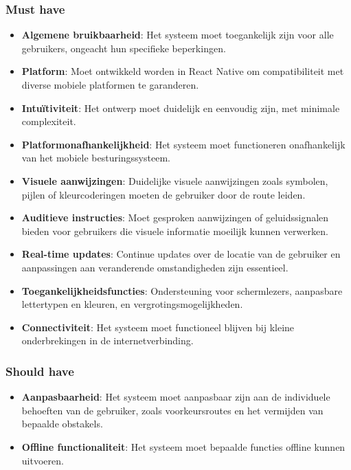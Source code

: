 \subsubsection{Must have}
\begin{itemize}
    \item \textbf{Algemene bruikbaarheid}: Het systeem moet toegankelijk zijn voor alle gebruikers, ongeacht hun specifieke beperkingen.
    \item \textbf{Platform}: Moet ontwikkeld worden in React Native om compatibiliteit met diverse mobiele platformen te garanderen.
    \item \textbf{Intuïtiviteit}: Het ontwerp moet duidelijk en eenvoudig zijn, met minimale complexiteit.
    \item \textbf{Platformonafhankelijkheid}: Het systeem moet functioneren onafhankelijk van het mobiele besturingssysteem.
    \item \textbf{Visuele aanwijzingen}: Duidelijke visuele aanwijzingen zoals symbolen, pijlen of kleurcoderingen moeten de gebruiker door de route leiden.
    \item \textbf{Auditieve instructies}: Moet gesproken aanwijzingen of geluidssignalen bieden voor gebruikers die visuele informatie moeilijk kunnen verwerken.
    \item \textbf{Real-time updates}: Continue updates over de locatie van de gebruiker en aanpassingen aan veranderende omstandigheden zijn essentieel.
    \item \textbf{Toegankelijkheidsfuncties}: Ondersteuning voor schermlezers, aanpasbare lettertypen en kleuren, en vergrotingsmogelijkheden.
    \item \textbf{Connectiviteit}: Het systeem moet functioneel blijven bij kleine onderbrekingen in de internetverbinding.
\end{itemize}

\subsubsection{Should have}
\begin{itemize}
    \item \textbf{Aanpasbaarheid}: Het systeem moet aanpasbaar zijn aan de individuele behoeften van de gebruiker, zoals voorkeursroutes en het vermijden van bepaalde obstakels.
    \item \textbf{Offline functionaliteit}: Het systeem moet bepaalde functies offline kunnen uitvoeren.
\end{itemize}

